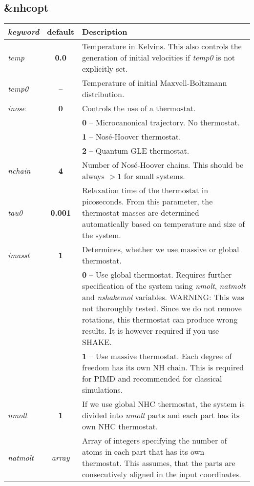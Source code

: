 \documentclass[12pt,a4paper]{article}
\begin{document}
\subsection{\&nhcopt}
\begin{tabular}{lcp{13cm}}
\textit{keyword} & \textbf{default} & Description \\
\hline
\textit{temp} & \textbf{0.0} &  Temperature in Kelvins.
This also controls the generation of initial velocities if \textit{temp0} is not explicitly set. \\ 
\textit{temp0} & -- &  Temperature of initial Maxvell-Boltzmann distribution. \\
\textit{inose} & \textbf{0} &  Controls the use of a thermostat. \\
& & \textbf{0} -- Microcanonical trajectory. No thermostat. \\
& & \textbf{1} -- Nos\'{e}-Hoover thermostat.\\
& & \textbf{2} -- Quantum GLE thermostat.\\


\textit{nchain} & \textbf{4} & Number of Nos\'{e}-Hoover chains. This should be always $>1$ for small systems. \\

\textit{tau0} & \textbf{0.001} & Relaxation time of the thermostat in picoseconds. From this parameter, 
the thermostat masses are determined automatically based on temperature and size of the system.\cite{Tuckerman_book} \\

\textit{imasst} & \textbf{1} & Determines, whether we use massive or global thermostat. \\
& & \textbf{0} -- Use global thermostat.
Requires further specification of the system using \textit{nmolt}, \textit{natmolt} and \textit{nshakemol} variables.
WARNING: This was not thoroughly tested.
Since we do not remove rotations, this thermostat can produce wrong results. It is however required if you use SHAKE.\\
& & \textbf{1} -- Use massive thermostat. Each degree of freedom has its own NH chain.
This is required for PIMD and recommended for classical simulations. \\

\textit{nmolt} & \textbf{1} & If we use global NHC thermostat, the system is divided into \textit{nmolt} parts
and each part has its own NHC thermostat. \\

\textit{natmolt} & \textit{array}& Array of integers specifying the number of atoms in each part that has its own thermostat.
This assumes, that the parts are consecutively aligned in the input coordinates.  \\


\end{tabular}
\end{document}
